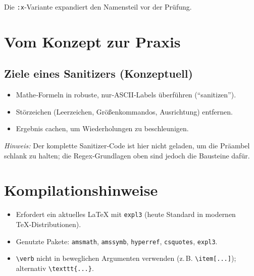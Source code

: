 \documentclass[11pt,a4paper]{book}
\begin{document}
Die \texttt{:x}‑Variante expandiert den Namensteil vor der Prüfung.



\chapter{Vom Konzept zur Praxis}

\section{Ziele eines Sanitizers (Konzeptuell)}

\begin{itemize}

  \item Mathe‑Formeln in robuste, nur‑ASCII‑Labels überführen (\enquote{sanitizen}).

  \item Störzeichen (Leerzeichen, Größenkommandos, Ausrichtung) entfernen.

  \item Ergebnis cachen, um Wiederholungen zu beschleunigen.

\end{itemize}

\noindent\textit{Hinweis:} Der komplette Sanitizer‑Code ist hier nicht geladen, um die Präambel schlank zu halten; die Regex‑Grundlagen oben sind jedoch die Bausteine dafür.



\chapter{Kompilationshinweise}

\begin{itemize}

  \item Erfordert ein aktuelles LaTeX mit \texttt{expl3} (heute Standard in modernen TeX‑Distributionen).

  \item Genutzte Pakete: \texttt{amsmath}, \texttt{amssymb}, \texttt{hyperref}, \texttt{csquotes}, \texttt{expl3}.

  \item \verb|\verb| nicht in beweglichen Argumenten verwenden (z.\,B. \verb|\item[...]|); alternativ \verb|\texttt{...}|.

\end{itemize}
\end{document}
